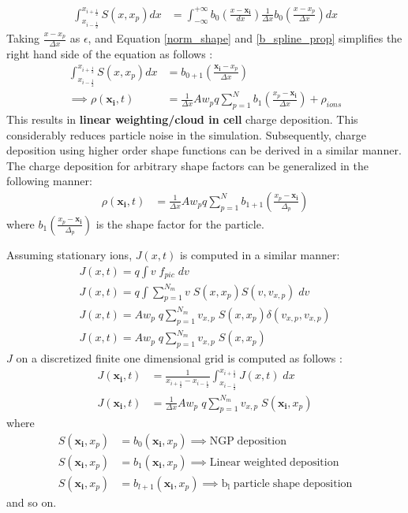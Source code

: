\documentclass{article}
\begin{document}
\begin{align}
\int_{x_{i - \frac{1}{2}}}^{x_{i + \frac{1}{2}}} S(x, x_{p})dx &= \int_{-\infty}^{+\infty}b_{0}\left(\frac{x - \mathbf{x_{i}}}{dx}\right) \frac{1}{\Delta x}b_{0}(\frac{x - x_{p}}{\Delta x})dx
\end{align}
Taking $\frac{x - x_{p}}{\Delta x}$ as $\epsilon$, and Equation \ref{norm_shape} and \ref{b_spline_prop} simplifies the right hand side of the equation as follows :
\begin{align}
\int_{x_{i - \frac{1}{2}}}^{x_{i + \frac{1}{2}}} S(x, x_{p})dx &= b_{0+1}(\frac{\mathbf{x_{i}}- x_{p}}{\Delta x}) \\
\implies  \rho(\mathbf{x_{i}}, t) &= \frac{1 }{\Delta x}Aw_{p}q \sum_{p = 1}^{N} b_{1}\left(\frac{x_{p} - \mathbf{x_{i}}}{\Delta x}\right) + \rho_{ions}
\end{align}
This results in \textbf{linear weighting/cloud in cell} charge deposition. This considerably reduces particle noise in the simulation. Subsequently, charge deposition using higher order shape functions can be derived in a similar manner. The charge deposition for arbitrary shape factors can be generalized in the following manner:
\begin{align}
\rho(\mathbf{x_{i}}, t) &= \frac{1 }{\Delta x}Aw_{p}q \sum_{p = 1}^{N} b_{1 + 1}\left(\frac{x_{p} - \mathbf{x_{i}}}{\Delta_{p}}\right)
\end{align}
where $b_{1}\left(\frac{x_{p}-\mathbf{x_{i}}}{\Delta_{p}}\right)$ is the shape factor for the particle.

Assuming stationary ions, $J(x, t)$ is computed in a similar manner:
\begin{align}
J (x, t) = q \int v\;f_{pic}\;dv \\
J (x, t) = q \int \sum_{p=1}^{N_{m}} v\;S(x, x_{p})S(v, v_{x,p})\;dv \\
J (x, t) =  Aw_{p}\;q \sum_{p=1}^{N_{m}} v_{x,p}\;S(x, x_{p})\delta(v_{x,p}, v_{x,p}) \\
J (x, t) =  Aw_{p}\;q \sum_{p=1}^{N_{m}} v_{x,p}\;S(x, x_{p}) 
\end{align}
$J$ on a discretized finite one dimensional grid is computed as follows :
\begin{align}
J(\mathbf{x_{i}}, t) &= \frac{1}{x_{i + \frac{1}{2}} - x_{i - \frac{1}{2}}}\int_{x_{i - \frac{1}{2}}}^{x_{i + \frac{1}{2}}} J(x,t) \;dx \\
J(\mathbf{x_{i}}, t) &= \frac{1}{\Delta x} Aw_{p}\;q \sum_{p=1}^{N_{m}} v_{x,p}\;S(\mathbf{x_{i}}, x_{p}) 
\end{align}
where 
\begin{align}
S(\mathbf{x_{i}}, x_{p}) &= b_{0}(\mathbf{x_{i}}, x_{p}) \implies \mathrm{NGP\;deposition} \\
S(\mathbf{x_{i}}, x_{p}) &= b_{1}(\mathbf{x_{i}}, x_{p}) \implies  \mathrm{Linear\;weighted\;deposition} \\
S(\mathbf{x_{i}}, x_{p}) &= b_{l + 1}(\mathbf{x_{i}}, x_{p}) \implies  \mathrm{b_{l}\;particle\;shape\;deposition}
\end{align}
and so on.
\end{document}
